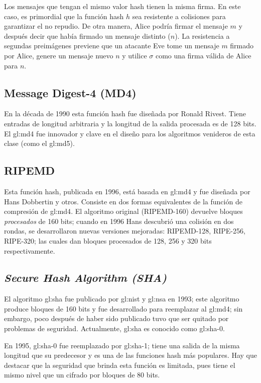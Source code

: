 Los mensajes que tengan el mismo valor hash tienen la misma firma. En
este caso, es primordial que la función hash $h$ sea resistente a
colisiones para garantizar el no repudio. De otra manera, Alice podría
firmar el mensaje $m$ y después decir que había firmado un mensaje
distinto ($n$).
La resistencia a segundas preimágenes previene que un atacante Eve tome
un mensaje $m$ firmado por Alice, genere un mensaje nuevo $n$ y utilice
$\sigma$ como una firma válida de Alice para $n$.

\subsection{Message Digest-4 (MD4)}
En la década de 1990 esta función hash fue diseñada por Ronald Rivest.
Tiene entradas de longitud arbitraria y la longitud de la salida
procesada es de 128 bits. El \acrshort{gl:md4} fue innovador y
clave en el diseño para los algoritmos venideros de esta clase (como
el \acrshort{gl:md5}).

\subsection{RIPEMD}
Esta función hash, publicada en 1996, está basada en \acrshort{gl:md4} y fue
diseñada por Hans Dobbertin y otros. Consiste en dos formas equivalentes de la
función de compresión de \acrshort{gl:md4}. El algoritmo original (RIPEMD-160)
devuelve bloques \textit{procesados} de 160 bits; cuando en 1996 Hans
descubrió una colisión en dos rondas, se desarrollaron nuevas versiones
mejoradas: RIPEMD-128, RIPE-256, RIPE-320; las cuales dan bloques procesados de
128, 256 y 320 bits respectivamente.

\subsection{\textit{Secure Hash Algorithm (SHA)}}
El algoritmo \acrshort{gl:sha} fue publicado por \acrshort{gl:nist} y
\acrshort{gl:nsa} en 1993; este algoritmo produce bloques de 160 bits y
fue desarrollado para reemplazar al \acrshort{gl:md4}; sin embargo, poco
después de haber sido publicado tuvo que ser quitado por problemas de
seguridad. Actualmente, \acrshort{gl:sha} es conocido como \acrshort{gl:sha}-0.

En 1995, \acrshort{gl:sha}-0 fue reemplazado por \acrshort{gl:sha}-1; tiene
una salida de la misma longitud que su predecesor y es una de las funciones
hash más populares. Hay que destacar que la seguridad que brinda esta función
es limitada, pues tiene el mismo nivel que un cifrado por bloques de 80 bits.

